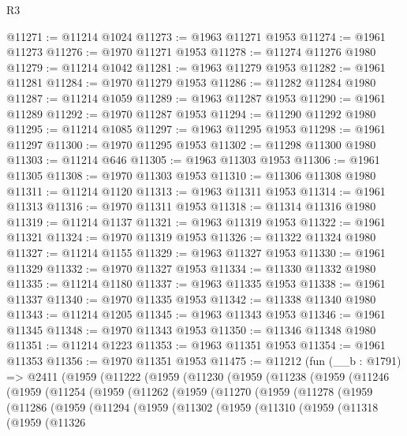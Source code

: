 \begin{lexlean}{R3}
\begin{coremodule}
@11271 := @11214 @1024
@11273 := @1963 @11271 @1953
@11274 := @1961 @11273
@11276 := @1970 @11271 @1953
@11278 := @11274 @11276 @1980
@11279 := @11214 @1042
@11281 := @1963 @11279 @1953
@11282 := @1961 @11281
@11284 := @1970 @11279 @1953
@11286 := @11282 @11284 @1980
@11287 := @11214 @1059
@11289 := @1963 @11287 @1953
@11290 := @1961 @11289
@11292 := @1970 @11287 @1953
@11294 := @11290 @11292 @1980
@11295 := @11214 @1085
@11297 := @1963 @11295 @1953
@11298 := @1961 @11297
@11300 := @1970 @11295 @1953
@11302 := @11298 @11300 @1980
@11303 := @11214 @646
@11305 := @1963 @11303 @1953
@11306 := @1961 @11305
@11308 := @1970 @11303 @1953
@11310 := @11306 @11308 @1980
@11311 := @11214 @1120
@11313 := @1963 @11311 @1953
@11314 := @1961 @11313
@11316 := @1970 @11311 @1953
@11318 := @11314 @11316 @1980
@11319 := @11214 @1137
@11321 := @1963 @11319 @1953
@11322 := @1961 @11321
@11324 := @1970 @11319 @1953
@11326 := @11322 @11324 @1980
@11327 := @11214 @1155
@11329 := @1963 @11327 @1953
@11330 := @1961 @11329
@11332 := @1970 @11327 @1953
@11334 := @11330 @11332 @1980
@11335 := @11214 @1180
@11337 := @1963 @11335 @1953
@11338 := @1961 @11337
@11340 := @1970 @11335 @1953
@11342 := @11338 @11340 @1980
@11343 := @11214 @1205
@11345 := @1963 @11343 @1953
@11346 := @1961 @11345
@11348 := @1970 @11343 @1953
@11350 := @11346 @11348 @1980
@11351 := @11214 @1223
@11353 := @1963 @11351 @1953
@11354 := @1961 @11353
@11356 := @1970 @11351 @1953
@11475 := @11212
    (fun (__b : @1791) =>
    @2411
      (@1959
        (@11222
          (@1959
            (@11230
              (@1959
                (@11238
                  (@1959
                    (@11246
                      (@1959
                        (@11254
                          (@1959
                            (@11262
                              (@1959
                                (@11270
                                  (@1959
                                    (@11278
                                      (@1959
                                        (@11286
                                          (@1959
                                            (@11294
                                              (@1959
                                                (@11302
                                                  (@1959
                                                    (@11310
                                                      (@1959
                                                        (@11318
                                                          (@1959
                                                            (@11326

\end{coremodule}
\end{lexlean}
